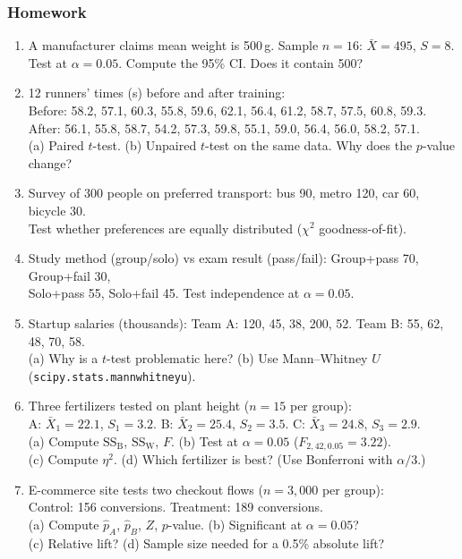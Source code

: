 \documentclass[aspectratio=169]{beamer}
\begin{document}
\begin{frame}
\frametitle{Homework}
\small
\begin{enumerate}\setlength{\itemsep}{4pt}
  \item A manufacturer claims mean weight is 500\,g. Sample $n = 16$: $\bar{X} = 495$, $S = 8$.\\
    Test at $\alpha = 0.05$. Compute the 95\% CI. Does it contain 500?

  \item 12 runners' times (s) before and after training:\\
    Before: 58.2, 57.1, 60.3, 55.8, 59.6, 62.1, 56.4, 61.2, 58.7, 57.5, 60.8, 59.3.\\
    After: 56.1, 55.8, 58.7, 54.2, 57.3, 59.8, 55.1, 59.0, 56.4, 56.0, 58.2, 57.1.\\
    (a) Paired $t$-test. (b) Unpaired $t$-test on the same data. Why does the $p$-value change?

  \item Survey of 300 people on preferred transport: bus 90, metro 120, car 60, bicycle 30.\\
    Test whether preferences are equally distributed ($\chi^2$ goodness-of-fit).

  \item Study method (group/solo) vs exam result (pass/fail): Group+pass 70, Group+fail 30,\\
    Solo+pass 55, Solo+fail 45. Test independence at $\alpha = 0.05$.

  \item Startup salaries (thousands): Team A: 120, 45, 38, 200, 52. Team B: 55, 62, 48, 70, 58.\\
    (a) Why is a $t$-test problematic here? (b) Use Mann--Whitney $U$ (\texttt{scipy.stats.mannwhitneyu}).

  \item Three fertilizers tested on plant height ($n = 15$ per group):\\
    A: $\bar{X}_1 = 22.1$, $S_1 = 3.2$. \;B: $\bar{X}_2 = 25.4$, $S_2 = 3.5$. \;C: $\bar{X}_3 = 24.8$, $S_3 = 2.9$.\\
    (a) Compute $\text{SS}_\text{B}$, $\text{SS}_\text{W}$, $F$. (b) Test at $\alpha = 0.05$ ($F_{2,42,0.05} = 3.22$).\\
    (c) Compute $\eta^2$. (d) Which fertilizer is best? (Use Bonferroni with $\alpha/3$.)

  \item E-commerce site tests two checkout flows ($n = 3{,}000$ per group):\\
    Control: 156 conversions. \;Treatment: 189 conversions.\\
    (a) Compute $\hat{p}_A$, $\hat{p}_B$, $Z$, $p$-value. (b) Significant at $\alpha = 0.05$?\\
    (c) Relative lift? (d) Sample size needed for a 0.5\% absolute lift?


\end{enumerate}
\end{frame}
\end{document}
